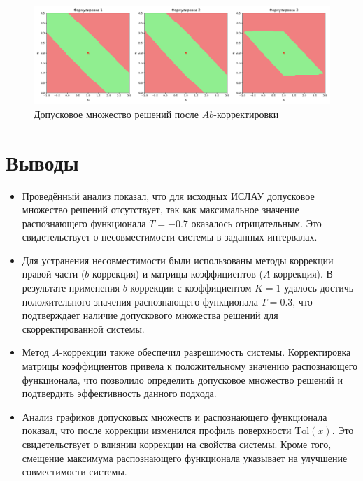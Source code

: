 \documentclass{article}
\begin{document}
\begin{figure}[H]
    \begin{center}
        \includegraphics[width = \textwidth]{tol_functional_ab_corrected}
        \caption{Допусковое множество решений после \( Ab \)-корректировки}
  \label{figure:tol_functional_ab_corrected}
    \end{center}
\end{figure}


\section{Выводы}

\begin{itemize}
  \item Проведённый анализ показал, что для исходных ИСЛАУ допусковое множество решений отсутствует, так как максимальное значение распознающего функционала \( T = -0.7 \) оказалось отрицательным. Это свидетельствует о несовместимости системы в заданных интервалах.
  \item Для устранения несовместимости были использованы методы коррекции правой части (\( b \)-коррекция) и матрицы коэффициентов (\( A \)-коррекция). В результате применения \( b \)-коррекции с коэффициентом \( K = 1 \) удалось достичь положительного значения распознающего функционала \( T = 0.3 \), что подтверждает наличие допускового множества решений для скорректированной системы.
  \item Метод \( A \)-коррекции также обеспечил разрешимость системы. Корректировка матрицы коэффициентов привела к положительному значению распознающего функционала, что позволило определить допусковое множество решений и подтвердить эффективность данного подхода.
  \item Анализ графиков допусковых множеств и распознающего функционала показал, что после коррекции изменился профиль поверхности \( \text{Tol}(x) \). Это свидетельствует о влиянии коррекции на свойства системы. Кроме того, смещение максимума распознающего функционала указывает на улучшение совместимости системы.
\end{itemize}
\end{document}
